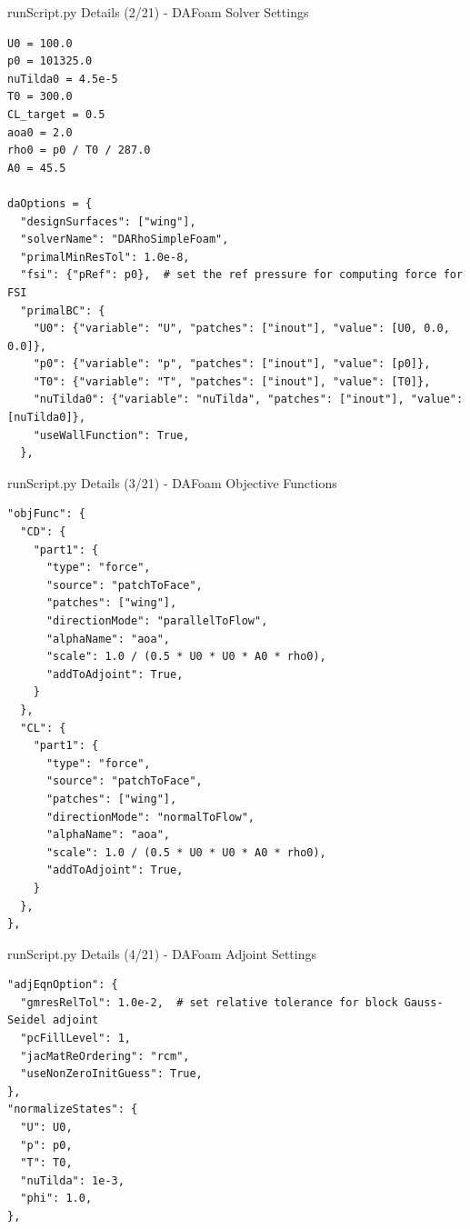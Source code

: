 \documentclass{bredelebeamer}
\begin{document}
\begin{frame}[fragile]{runScript.py Details (2/21) - \large DAFoam Solver Settings}
\scriptsize
\lstset{ language=bash }
\begin{lstlisting}
U0 = 100.0
p0 = 101325.0
nuTilda0 = 4.5e-5
T0 = 300.0
CL_target = 0.5
aoa0 = 2.0
rho0 = p0 / T0 / 287.0
A0 = 45.5

daOptions = {
  "designSurfaces": ["wing"],
  "solverName": "DARhoSimpleFoam",
  "primalMinResTol": 1.0e-8,
  "fsi": {"pRef": p0},  # set the ref pressure for computing force for FSI
  "primalBC": {
    "U0": {"variable": "U", "patches": ["inout"], "value": [U0, 0.0, 0.0]},
    "p0": {"variable": "p", "patches": ["inout"], "value": [p0]},
    "T0": {"variable": "T", "patches": ["inout"], "value": [T0]},
    "nuTilda0": {"variable": "nuTilda", "patches": ["inout"], "value": [nuTilda0]},
    "useWallFunction": True,
  },
\end{lstlisting}
\normalsize
\end{frame}

\begin{frame}[fragile]{runScript.py Details (3/21) - \large DAFoam Objective Functions}
\scriptsize
\lstset{ language=bash }
\begin{lstlisting}
"objFunc": {
  "CD": {
    "part1": {
      "type": "force",
      "source": "patchToFace",
      "patches": ["wing"],
      "directionMode": "parallelToFlow",
      "alphaName": "aoa",
      "scale": 1.0 / (0.5 * U0 * U0 * A0 * rho0),
      "addToAdjoint": True,
    }
  },
  "CL": {
    "part1": {
      "type": "force",
      "source": "patchToFace",
      "patches": ["wing"],
      "directionMode": "normalToFlow",
      "alphaName": "aoa",
      "scale": 1.0 / (0.5 * U0 * U0 * A0 * rho0),
      "addToAdjoint": True,
    }
  },
},
\end{lstlisting}
\normalsize
\end{frame}

\begin{frame}[fragile]{runScript.py Details (4/21) - \large DAFoam Adjoint Settings}
\scriptsize
\lstset{ language=bash }
\begin{lstlisting}
"adjEqnOption": {
  "gmresRelTol": 1.0e-2,  # set relative tolerance for block Gauss-Seidel adjoint
  "pcFillLevel": 1,
  "jacMatReOrdering": "rcm",
  "useNonZeroInitGuess": True,
},
"normalizeStates": {
  "U": U0,
  "p": p0,
  "T": T0,
  "nuTilda": 1e-3,
  "phi": 1.0,
},
\end{lstlisting}
\normalsize
\end{frame}
\end{document}
